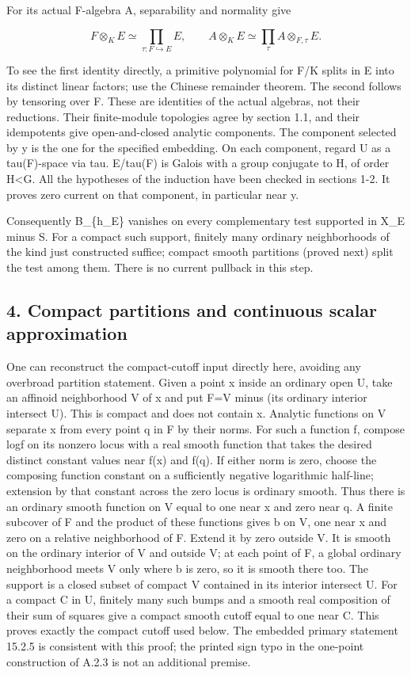 \documentclass[
  10pt,
]{article}
\begin{document}
For its actual F-algebra A, separability and normality give

\[
 F\otimes_K E\simeq\prod_{\tau:F\hookrightarrow E}E,
 \qquad
 A\otimes_K E\simeq\prod_{\tau}A\otimes_{F,\tau}E.           \tag{16}
\]

To see the first identity directly, a primitive polynomial for F/K
splits in E into its distinct linear factors; use the Chinese remainder
theorem. The second follows by tensoring over F. These are identities of
the actual algebras, not their reductions. Their finite-module
topologies agree by section 1.1, and their idempotents give
open-and-closed analytic components. The component selected by y is the
one for the specified embedding. On each component, regard U as a
tau(F)-space via tau. E/tau(F) is Galois with a group conjugate to H, of
order \textbar H\textbar\textless\textbar G\textbar. All the hypotheses
of the induction have been checked in sections 1-2. It proves zero
current on that component, in particular near y.

Consequently B\_\{h\_E\} vanishes on every complementary test supported
in X\_E minus S. For a compact such support, finitely many ordinary
neighborhoods of the kind just constructed suffice; compact smooth
partitions (proved next) split the test among them. There is no current
pullback in this step.

\subsection{4. Compact partitions and continuous scalar
approximation}\label{compact-partitions-and-continuous-scalar-approximation}

One can reconstruct the compact-cutoff input directly here, avoiding any
overbroad partition statement. Given a point x inside an ordinary open
U, take an affinoid neighborhood V of x and put F=V minus (its ordinary
interior intersect U). This is compact and does not contain x. Analytic
functions on V separate x from every point q in F by their norms. For
such a function f, compose log\textbar f\textbar{} on its nonzero locus
with a real smooth function that takes the desired distinct constant
values near \textbar f(x)\textbar{} and \textbar f(q)\textbar. If either
norm is zero, choose the composing function constant on a sufficiently
negative logarithmic half-line; extension by that constant across the
zero locus is ordinary smooth. Thus there is an ordinary smooth function
on V equal to one near x and zero near q. A finite subcover of F and the
product of these functions gives b on V, one near x and zero on a
relative neighborhood of F. Extend it by zero outside V. It is smooth on
the ordinary interior of V and outside V; at each point of F, a global
ordinary neighborhood meets V only where b is zero, so it is smooth
there too. The support is a closed subset of compact V contained in its
interior intersect U. For a compact C in U, finitely many such bumps and
a smooth real composition of their sum of squares give a compact smooth
cutoff equal to one near C. This proves exactly the compact cutoff used
below. The embedded primary statement 15.2.5 is consistent with this
proof; the printed sign typo in the one-point construction of A.2.3 is
not an additional premise.
\end{document}
